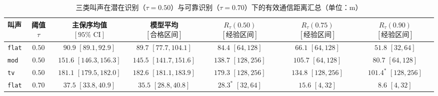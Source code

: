 \documentclass{apmcmthesis}
\begin{document}
\begin{table}[htbp]
\centering
\caption{三类叫声在潜在识别（$\tau=0.50$）与可靠识别（$\tau=0.70$）下的有效通信距离汇总（单位：$\text{m}$）}
\label{tab:p2_ranges}
\footnotesize\setlength{\tabcolsep}{2pt}
\begin{tabular*}{\linewidth}{@{\extracolsep{\fill}}lcccccc@{}}
\toprule
叫声 & 阈值 $\tau$ & \shortstack{主保序均值\\[1pt]$[95\%\text{ CI}]$} & \shortstack{模型平均\\[1pt]$[\text{合格区间}]$} & \shortstack{$R_\tau(0.50)$\\[1pt]$[\text{经验区间}]$} & \shortstack{$R_\tau(0.75)$\\[1pt]$[\text{经验区间}]$} & \shortstack{$R_\tau(0.90)$\\[1pt]$[\text{经验区间}]$} \\
\midrule
\texttt{flat} & $0.50$ & \shortstack{$90.9$\\[1pt]$[89.1, 92.9]$} & \shortstack{$89.7$\\[1pt]$[77.7, 104.1]$} & \shortstack{$84.4$\\[1pt]$[64, 128]$} & \shortstack{$66.1$\\[1pt]$[64, 128]$} & \shortstack{$51.8$\\[1pt]$[32, 64]$} \\
\texttt{mod} & $0.50$ & \shortstack{$151.6$\\[1pt]$[146.3, 156.3]$} & \shortstack{$145.5$\\[1pt]$[141.7, 151.6]$} & \shortstack{$138.7$\\[1pt]$[128, 256]$} & \shortstack{$105.7$\\[1pt]$[64, 128]$} & \shortstack{$80.7$\\[1pt]$[64, 128]$} \\
\texttt{tv} & $0.50$ & \shortstack{$181.1$\\[1pt]$[179.5, 182.0]$} & \shortstack{$182.6$\\[1pt]$[181.1, 183.9]$} & \shortstack{$179.3$\\[1pt]$[128, 256]$} & \shortstack{$134.8$\\[1pt]$[128, 256]$} & \shortstack{$101.4^*$\\[1pt]$[128, 256]$} \\
\midrule
\texttt{flat} & $0.70$ & \shortstack{$37.5$\\[1pt]$[33.8, 40.9]$} & \shortstack{$35.5$\\[1pt]$[28.8, 40.8]$} & \shortstack{$28.3^*$\\[1pt]$[32, 64]$} & \shortstack{$15.6$\\[1pt]$[4, 32]$} & \shortstack{$8.6$\\[1pt]$[4, 32]$} \\

\end{tabular*}
\end{table}
\end{document}
